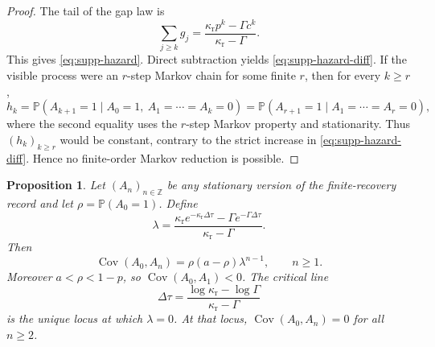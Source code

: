\documentclass[11pt]{amsart}
\numberwithin{equation}{section}
\newtheorem{proposition}{Proposition}[section]
\theoremstyle{remark}
\newcommand{\PP}{\mathbb{P}}
\begin{document}
\begin{proof}
The tail of the gap law is
\[
\sum_{j\ge k}g_j=
\frac{\kappa_{\mathrm r}p^k-\Gamma c^k}{\kappa_{\mathrm r}-\Gamma}.
\]
This gives \cref{eq:supp-hazard}. Direct subtraction yields \cref{eq:supp-hazard-diff}. If the visible process were an $r$-step Markov chain for some finite $r$, then for every $k\ge r$,
\[
h_k
=
\PP(A_{k+1}=1\mid A_0=1,\ A_1=\cdots=A_k=0)
=
\PP(A_{r+1}=1\mid A_1=\cdots=A_r=0),
\]
where the second equality uses the $r$-step Markov property and stationarity. Thus $(h_k)_{k\ge r}$ would be constant, contrary to the strict increase in \cref{eq:supp-hazard-diff}. Hence no finite-order Markov reduction is possible.
\end{proof}

\begin{proposition}\label{prop:supp-cov}
Let $(A_n)_{n\in\mathbb Z}$ be any stationary version of the finite-recovery record and let $\rho=\PP(A_0=1)$. Define
\begin{equation}\label{eq:supp-lambda}
\lambda=
\frac{\kappa_{\mathrm r}e^{-\kappa_{\mathrm r}\Delta\tau}-\Gamma e^{-\Gamma\Delta\tau}}
{\kappa_{\mathrm r}-\Gamma}.
\end{equation}
Then
\begin{equation}\label{eq:supp-cov}
\operatorname{Cov}(A_0,A_n)=\rho(a-\rho)\lambda^{n-1},\qquad n\ge1.
\end{equation}
Moreover $a<\rho<1-p$, so $\operatorname{Cov}(A_0,A_1)<0$. The critical line
\begin{equation}\label{eq:supp-critical}
\Delta\tau=\frac{\log\kappa_{\mathrm r}-\log\Gamma}{\kappa_{\mathrm r}-\Gamma}
\end{equation}
is the unique locus at which $\lambda=0$. At that locus, $\operatorname{Cov}(A_0,A_n)=0$ for all $n\ge2$.
\end{proposition}
\end{document}
